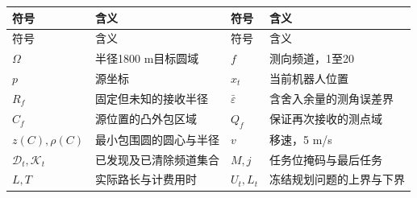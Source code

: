 \documentclass[UTF8,zihao=-4,fontset=windows]{ctexart}
\begin{document}
\begin{longtable}[]{@{}
  >{\raggedright\arraybackslash}p{}
  >{\raggedright\arraybackslash}p{}
  >{\raggedright\arraybackslash}p{}
  >{\raggedright\arraybackslash}p{}@{}}

\toprule\noalign{}
\begin{minipage}[b]{\linewidth}\raggedright
符号
\end{minipage} & \begin{minipage}[b]{\linewidth}\raggedright
含义
\end{minipage} & \begin{minipage}[b]{\linewidth}\raggedright
符号
\end{minipage} & \begin{minipage}[b]{\linewidth}\raggedright
含义
\end{minipage} \\
\midrule\noalign{}
\endfirsthead
\toprule\noalign{}
\begin{minipage}[b]{\linewidth}\raggedright
符号
\end{minipage} & \begin{minipage}[b]{\linewidth}\raggedright
含义
\end{minipage} & \begin{minipage}[b]{\linewidth}\raggedright
符号
\end{minipage} & \begin{minipage}[b]{\linewidth}\raggedright
含义
\end{minipage} \\
\midrule\noalign{}
\endhead
\bottomrule\noalign{}
\endlastfoot
\(\Omega\) & 半径1800 m目标圆域 & \(f\) & 测向频道，1至20 \\
\(p\) & 源坐标 & \(x_t\) & 当前机器人位置 \\
\(R_f\) & 固定但未知的接收半径 & \(\bar\varepsilon\) & 含舍入余量的测角误差界 \\
\(\widehat C_f\) & 源位置的凸外包区域 & \(Q_f\) & 保证再次接收的测点域 \\
\(z(C),\rho(C)\) & 最小包围圆的圆心与半径 & \(v\) & 移速，5 m/s \\
\(\mathcal D_t,\mathcal K_t\) & 已发现及已清除频道集合 & \(M,j\) & 任务位掩码与最后任务 \\
\(L,T\) & 实际路长与计费用时 & \(U_t,L_t\) & 冻结规划问题的上界与下界 \\
\end{longtable}
\end{document}
